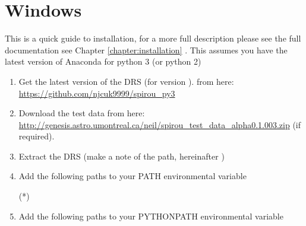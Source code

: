 \section{Windows}
\label{chapter:quickinstallation:windows}



\noindent This is a quick guide to installation, for a more full description please \ifquickguide see the full documentation \else see Chapter \ref{chapter:installation} \fi. This assumes you have the latest version of Anaconda for python 3 (or python 2)


\begin{enumerate}

\item Get the latest version of the DRS (for \instrument version \MyCodeVersion). from here: \url{https://github.com/njcuk9999/spirou_py3}

\item Download the test data from here: \url{http://genesis.astro.umontreal.ca/neil/spirou_test_data_alpha0.1.003.zip} (if required).

\item Extract the DRS (make a note of the path, hereinafter \InstallDIR)

\item Add the following paths to your PATH environmental variable
\begin{textbox}[title={In "Environmental Variables"}]
(*\InstallDIR*)\bin\;
\end{textbox}

\item Add the following paths to your PYTHONPATH environmental variable
\begin{textbox}[title={In "Environmental Variables"}]
\end{textbox}


\end{enumerate}
